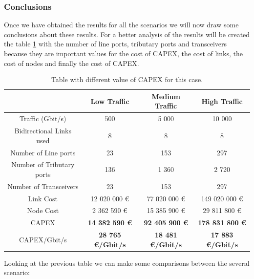 \vspace{13pt}

\subsubsection{Conclusions}

Once we have obtained the results for all the scenarios we will now draw some conclusions about these results. For a better analysis of the results will be created the table \ref{table_comparative_opaque_surv_heuristic} with the number of line ports, tributary ports and transceivers because they are important values for the cost of CAPEX, the cost of links, the cost of nodes and finally the cost of CAPEX.\\

\begin{table}[H]
\centering
\begin{tabular}{| c | c | c | c |}
 \hline
   & Low Traffic & Medium Traffic  & High Traffic \\
 \hline\hline
 Traffic (Gbit/s) & 500 & 5 000 & 10 000 \\ \hline
 Bidirectional Links used & 8 & 8 & 8 \\ \hline
 Number of Line ports & 23 & 153 & 297 \\ \hline
 Number of Tributary ports & 136 & 1 360 & 2 720 \\ \hline
 Number of Transceivers & 23 & 153 & 297 \\ \hline
 Link Cost & 12 020 000 \euro & 77 020 000 \euro & 149 020 000 \euro \\ \hline
 Node Cost & 2 362 590 \euro & 15 385 900 \euro & 29 811 800 \euro \\ \hline
 CAPEX & \textbf{14 382 590 \euro} & \textbf{92 405 900 \euro} & \textbf{178 831 800 \euro} \\ \hline
 CAPEX/Gbit/s & \textbf{28 765 \euro/Gbit/s} & \textbf{18 481 \euro/Gbit/s} & \textbf{17 883 \euro/Gbit/s} \\
 \hline
\end{tabular}
\caption{Table with different value of CAPEX for this case.}
\label{table_comparative_opaque_surv_heuristic}
\end{table}

Looking at the previous table we can make some comparisons between the several scenario:

